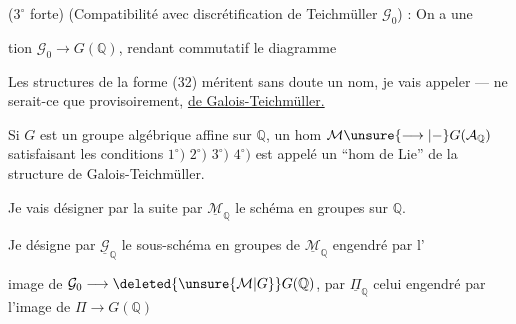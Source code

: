 ($3^{\circ}$ forte) (Compatibilité avec discrétification de Teichmüller $\mathcal{G}_0$) : On a une 


tion $\mathcal{G}_0\longrightarrow G(\mathbb{Q})$, rendant  commutatif le diagramme

Les structures de la forme (32) méritent sans doute un nom, je vais  appeler --- ne serait-ce que provisoirement, \uline{ de Galois-Teichmüller.}

Si $G$ est un groupe algébrique affine sur $\mathbb{Q}$, un hom $\mathcal{M}\unsure{\longrightarrow|{-}}G(\mathcal{A}_{\mathbb{Q}})$ satisfaisant les conditions $1^{\circ})$ $2^{\circ})$ $3^{\circ})$  $4^{\circ})$ est appelé un ``hom de Lie'' de la structure de Galois-Teichmüller.

Je vais désigner par la suite par $\underline{\mathcal{M}}_{\mathbb{Q}}$  le schéma en groupes  sur $\mathbb{Q}$. 

Je désigne par  $\underline{\mathcal{G}}_{\mathbb{Q}}$ le sous-schéma en groupes de $\underline{\mathcal{M}}_{\mathbb{Q}}$ engendré par l'


image de $\mathcal{G}_0\longrightarrow\deleted{\unsure{\mathcal{M}|G}}G(\mathbb{Q})$, par $\underline{\Pi}_{\mathbb{Q}}$ celui engendré par l'image de $\Pi\longrightarrow G(\mathbb{Q})$


